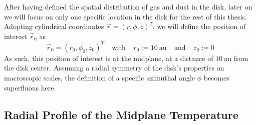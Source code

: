     After having defined the spatial distribution of gas and dust in the disk, later on we will 
    focus on only one specific location in the disk for the rest of this thesis. Adopting 
    cylindrical coordinates $\vec r = ( r, \phi, z )^T$, we will define the
    position of interest $\vec r_0$ as
    \begin{equation}
        \label{eq:definition_of_position_of_interest}
        \vec r_0 = (r_0, \phi_0, z_0 )^T
        \ \ \ \ \ \text{with} \ \ \ \ \
        r_0 := 10~\text{au}
        \ \ \ \ \ \text{and} \ \ \ \ \
        z_0 := 0
    \end{equation}
    As such, this position of interest is at the midplane, at a distance of $10\ \text{au}$ from 
    the disk center. Assuming a radial symmetry of the disk's properties on macroscopic scales, the
    definition of a specific azimuthal angle $\phi$ becomes superfluous here.

    
    
    
    
\clearpage\subsection{Radial Profile of the Midplane Temperature}


